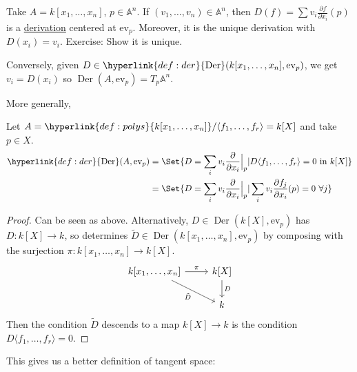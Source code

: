 \documentclass{article}
\newcommand{\A}{\mathbb{A}}
\DeclareMathOperator{\Der}{Der}
\begin{document}
\begin{eg}
    Take $A = k[x_1, \dotsc, x_n]$, $p \in \A^n$.
    If $(v_1, \dotsc, v_n) \in \A^n$, then $D(f) = \sum v_i \frac{\partial f}{\partial x_i} (p)$ is a \hyperlink{def:derivation}{derivation} centered at $\text{ev}_p$.
    Moreover, it is the unique derivation with $D(x_i) = v_i$. Exercise: Show it is unique.

    Conversely, given $D \in \hyperlink{def:der}{\Der}(k[x_1,\dotsc, x_n], \text{ev}_p)$, we get $v_i = D(x_i)$ so $\Der(A, \text{ev}_p) = T_p \A^n$.
\end{eg}
More generally,
\begin{lemma}
    Let $A = \hyperlink{def:polys}{k[x_1, \dotsc, x_n]}/\langle f_1, \dotsc, f_r \rangle = k[X]$ and take $p \in X$.
    \begin{align*}
        \hyperlink{def:der}{\Der}(A, \text{ev}_p) &= \Set{D = \sum_i v_i \frac{\partial}{\partial x_i}\Big\rvert_p | D \langle f_1, \dotsc, f_r \rangle = 0 \text{ in } k[X]} \\
                             &= \Set{D = \sum_i v_i \frac{\partial}{\partial x_i}\Big\rvert_p | \sum_i v_i \frac{\partial f_j}{\partial x_i}(p) = 0 \ \forall j}
    \end{align*}
\end{lemma}
\begin{proof}
    Can be seen as above.
Alternatively, $D \in \Der(k[X], \text{ev}_p)$ has $D: k[X] \to k$, so determines $\tilde{D} \in \Der(k[x_1, \dotsc, x_n], \text{ev}_p)$ by composing with the surjection $\pi: k[x_1, \dotsc, x_n] \to k[X]$.
    \begin{equation*}
        \begin{tikzcd}
            k[x_1, \dotsc, x_n] \rar["\pi"] \drar["\tilde{D}"'] & k[X] \dar["D"] \\
                                           & k
        \end{tikzcd}
    \end{equation*}
    Then the condition $\tilde{D}$ descends to a map $k[X] \to k$ is the condition $D\langle f_1, \dotsc, f_r \rangle = 0$.
\end{proof}
This gives us a better definition of tangent space:
\end{document}
